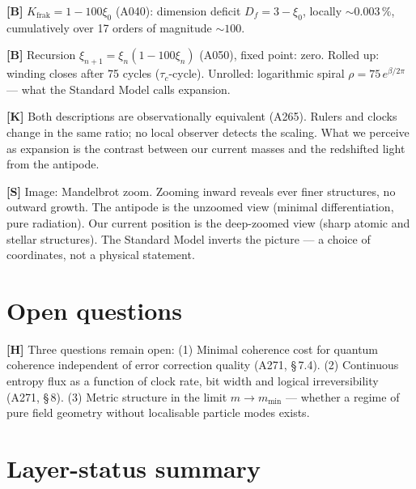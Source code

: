 \textbf{[B]} $K_\text{frak} = 1-100\xi_0$ (A040): dimension deficit
$D_f = 3-\xi_0$, locally $\sim 0{.}003\,\%$, cumulatively over 17
orders of magnitude $\sim 100$.

\textbf{[B]} Recursion $\xi_{n+1} = \xi_n(1-100\xi_n)$ (A050), fixed
point: zero. Rolled up: winding closes after 75 cycles ($\tau_c$-cycle).
Unrolled: logarithmic spiral $\rho = 75\,e^{\beta/2\pi}$ --- what the
Standard Model calls expansion.

\textbf{[K]} Both descriptions are observationally equivalent (A265).
Rulers and clocks change in the same ratio; no local observer detects
the scaling. What we perceive as expansion is the contrast between our
current masses and the redshifted light from the antipode.

\textbf{[S]} Image: Mandelbrot zoom. Zooming inward reveals ever finer
structures, no outward growth. The antipode is the unzoomed view
(minimal differentiation, pure radiation). Our current position is
the deep-zoomed view (sharp atomic and stellar structures). The Standard
Model inverts the picture --- a choice of coordinates, not a physical
statement.

\section{Open questions}

\textbf{[H]} Three questions remain open:
(1) Minimal coherence cost for quantum coherence independent of error
correction quality (A271, §\,7.4).
(2) Continuous entropy flux as a function of clock rate, bit width and
logical irreversibility (A271, §\,8).
(3) Metric structure in the limit $m \to m_\text{min}$ --- whether a
regime of pure field geometry without localisable particle modes exists.

\section{Layer-status summary}


